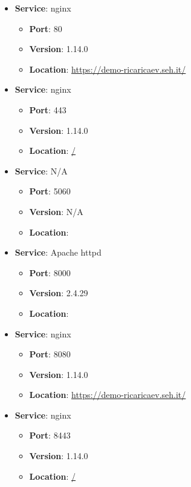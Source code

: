 \documentclass{article}
\begin{document}
\begin{itemize}
    
        \item \textbf{Service}: nginx
        \begin{itemize}
            \item \textbf{Port}: 80
            \item \textbf{Version}:  1.14.0 
            \item \textbf{Location}: \href{ https://demo-ricaricaev.seh.it/ }{ https://demo-ricaricaev.seh.it/ }
        \end{itemize}
    
        \item \textbf{Service}: nginx
        \begin{itemize}
            \item \textbf{Port}: 443
            \item \textbf{Version}:  1.14.0 
            \item \textbf{Location}: \href{ / }{ / }
        \end{itemize}
    
        \item \textbf{Service}: N/A
        \begin{itemize}
            \item \textbf{Port}: 5060
            \item \textbf{Version}:  N/A 
            \item \textbf{Location}: \href{  }{  }
        \end{itemize}
    
        \item \textbf{Service}: Apache httpd
        \begin{itemize}
            \item \textbf{Port}: 8000
            \item \textbf{Version}:  2.4.29 
            \item \textbf{Location}: \href{  }{  }
        \end{itemize}
    
        \item \textbf{Service}: nginx
        \begin{itemize}
            \item \textbf{Port}: 8080
            \item \textbf{Version}:  1.14.0 
            \item \textbf{Location}: \href{ https://demo-ricaricaev.seh.it/ }{ https://demo-ricaricaev.seh.it/ }
        \end{itemize}
    
        \item \textbf{Service}: nginx
        \begin{itemize}
            \item \textbf{Port}: 8443
            \item \textbf{Version}:  1.14.0 
            \item \textbf{Location}: \href{ / }{ / }
        \end{itemize}
    
\end{itemize}
\end{document}

